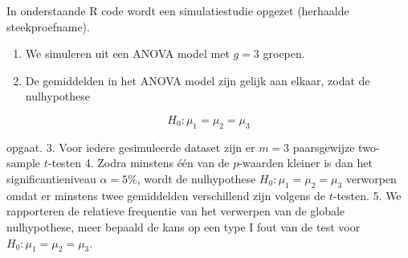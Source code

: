 \documentclass[
  12pt,dutch]{book}
\providecommand{\tightlist}{%
  \setlength{\itemsep}{0pt}\setlength{\parskip}{0pt}}
\theoremstyle{definition}
\theoremstyle{definition}
\theoremstyle{definition}
\theoremstyle{definition}
\theoremstyle{remark}
\begin{document}
In onderstaande R code wordt een simulatiestudie opgezet (herhaalde steekproefname).

\begin{enumerate}
\def\labelenumi{\arabic{enumi}.}
\tightlist
\item
  We simuleren uit een ANOVA model met \(g=3\) groepen.
\item
  De gemiddelden in het ANOVA model zijn gelijk aan elkaar, zodat de nulhypothese
\end{enumerate}

\[H_0: \mu_1=\mu_2=\mu_3\]

opgaat.
3. Voor iedere gesimuleerde dataset zijn er \(m=3\) paarsgewijze two-sample \(t\)-testen
4. Zodra minstens één van de \(p\)-waarden kleiner is dan het significantieniveau \(\alpha=5\%\), wordt de nulhypothese \(H_0: \mu_1=\mu_2=\mu_3\) verworpen omdat er minstens twee gemiddelden verschillend zijn volgens de \(t\)-testen.
5. We rapporteren de relatieve frequentie van het verwerpen van de globale nulhypothese, meer bepaald de kans op een type I fout van de test voor \(H_0: \mu_1=\mu_2=\mu_3\).
\end{document}
